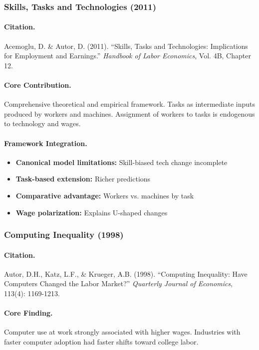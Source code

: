 \documentclass[12pt,a4paper]{article}
\begin{document}
\subsubsection{Skills, Tasks and Technologies (2011)}

\paragraph{Citation.}
Acemoglu, D. \& Autor, D. (2011). ``Skills, Tasks and Technologies:
Implications for Employment and Earnings.''
\emph{Handbook of Labor Economics}, Vol. 4B, Chapter 12.

\paragraph{Core Contribution.}
Comprehensive theoretical and empirical framework. Tasks as intermediate
inputs produced by workers and machines. Assignment of workers to tasks
is endogenous to technology and wages.

\paragraph{Framework Integration.}
\begin{itemize}
  \item \textbf{Canonical model limitations:} Skill-biased tech change incomplete
  \item \textbf{Task-based extension:} Richer predictions
  \item \textbf{Comparative advantage:} Workers vs. machines by task
  \item \textbf{Wage polarization:} Explains U-shaped changes
\end{itemize}

\subsubsection{Computing Inequality (1998)}

\paragraph{Citation.}
Autor, D.H., Katz, L.F., \& Krueger, A.B. (1998). ``Computing Inequality:
Have Computers Changed the Labor Market?''
\emph{Quarterly Journal of Economics}, 113(4): 1169-1213.

\paragraph{Core Finding.}
Computer use at work strongly associated with higher wages. Industries
with faster computer adoption had faster shifts toward college labor.
\end{document}
